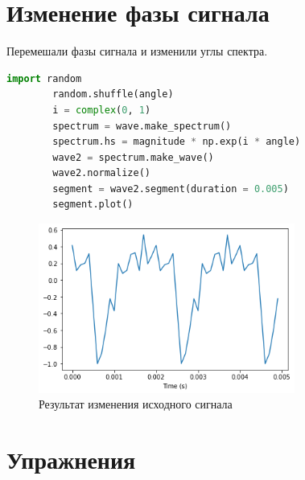 \documentclass[a4paper, 12pt]{report}
\begin{document}
	\chapter{Изменение фазы сигнала}
	Перемешали фазы сигнала и изменили углы спектра.
	\begin{lstlisting}[language=Python,caption=Изменение сигнала]
		import random
		random.shuffle(angle)
		i = complex(0, 1)
		spectrum = wave.make_spectrum()
		spectrum.hs = magnitude * np.exp(i * angle)
		wave2 = spectrum.make_wave()
		wave2.normalize()
		segment = wave2.segment(duration = 0.005)
		segment.plot()
	\end{lstlisting}
	\begin{figure}[H]
		\centering
		\includegraphics[width=0.75\textwidth]{segment1.png}
		\caption{Результат изменения исходного сигнала}
		\label{fig:segment1}
	\end{figure}

	\chapter{Упражнения}
\end{document}
